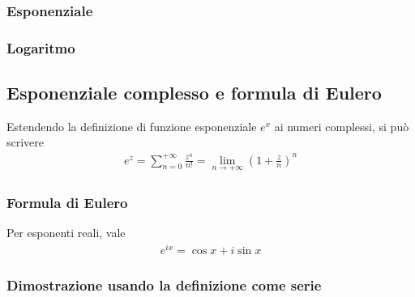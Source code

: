 \documentclass[letterpaper,10pt,italian]{jupyterBook}
\begin{document}
\subsubsection{Esponenziale}
\label{\detokenize{ch/algebra/complex-algebra-notes:esponenziale}}\label{\detokenize{ch/algebra/complex-algebra-notes:math-hs-algebra-complex-notes-fun-exp}}

\subsubsection{Logaritmo}
\label{\detokenize{ch/algebra/complex-algebra-notes:logaritmo}}\label{\detokenize{ch/algebra/complex-algebra-notes:math-hs-algebra-complex-notes-fun-log}}

\subsection{Esponenziale complesso e formula di Eulero}
\label{\detokenize{ch/algebra/complex-algebra-notes:esponenziale-complesso-e-formula-di-eulero}}\label{\detokenize{ch/algebra/complex-algebra-notes:math-hs-algebra-complex-notes-euler}}
\sphinxAtStartPar
Estendendo la definizione di funzione esponenziale \(e^x\) ai numeri complessi, si può scrivere
\begin{equation*}
\begin{split}e^z = \sum_{n = 0}^{+\infty} \frac{z^n}{n!} = \lim_{n \rightarrow +\infty} \left( 1 + \frac{z}{n} \right)^n\end{split}
\end{equation*}



\subsubsection{Formula di Eulero}
\label{\detokenize{ch/algebra/complex-algebra-notes:formula-di-eulero}}
\sphinxAtStartPar
Per esponenti reali, vale
\begin{equation*}
\begin{split}e^{i x} = \cos x + i \sin x\end{split}
\end{equation*}\subsubsection*{Dimostrazione usando la definizione come serie}
\end{document}
